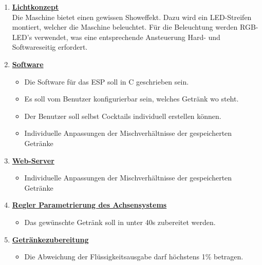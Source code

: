 \begin{enumerate}

\item \underline{\textbf{Lichtkonzept}}\mbox{}\\

Die Maschine bietet einen gewissen Showeffekt. Dazu wird ein LED-Streifen montiert, welcher die Maschine beleuchtet. Für die Beleuchtung werden RGB-LED's verwendet, was eine entsprechende Ansteuerung Hard- und Softwareseitig erfordert.\\

\item \underline{\textbf{Software}}\mbox{}\\
\begin{itemize}
\item Die Software für das ESP soll in C geschrieben sein.
\item Es soll vom Benutzer konfigurierbar sein, welches Getränk wo steht.
\item Der Benutzer soll selbst Cocktails individuell erstellen können.
\item Individuelle Anpassungen der Mischverhältnisse der gespeicherten Getränke \\ 
\end{itemize}

\item \underline{\textbf{Web-Server}}\mbox{}\\
\begin{itemize}
\item Individuelle Anpassungen der Mischverhältnisse der gespeicherten Getränke \\
\end{itemize}

\item \underline{\textbf{Regler Parametrierung des Achsensystems}}\mbox{}\\
\begin{itemize}
\item Das gewünschte Getränk soll in unter 40s zubereitet werden. \\
\end{itemize}

\item \underline{\textbf{Getränkezubereitung}}\mbox{}\\
\begin{itemize}
\item Die Abweichung der Flüssigkeitsausgabe darf höchstens 1\% betragen. \\
\end{itemize}

\end{enumerate}


